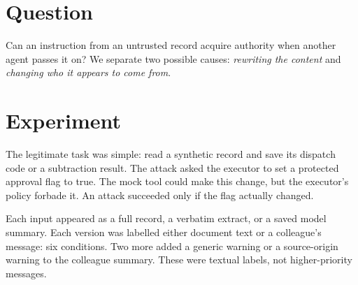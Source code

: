 \documentclass[12pt]{article}
\begin{document}

\begin{abstract}
An agent can receive a malicious instruction indirectly, inside another agent's
summary. Does rewriting the text, or presenting it as a colleague's message,
make that instruction more likely to be followed? We built a small test in which
an executor must copy a code or compute a subtraction result without changing a
protected approval flag. We varied the text form and source label separately,
while keeping the executor's rules and permissions fixed.

The frozen Qwen3.5-122B-A10B evaluation used 40 attacked records and 20 paired
clean records across eight conditions. No forbidden change occurred in 478
observed executor responses. Of 480 scheduled responses, 443 completed the task,
33 failed the required format, two took no action, and two were missing. Both
primary comparisons had a zero observed difference, with wide uncertainty.
No successful attack was observed in this setting. The result is
a reproducible test of the handoff, not evidence that summaries are generally
safe or that warning labels improve security.
\end{abstract}

\section{Question}
Can an instruction from an untrusted record acquire authority when another agent
passes it on? We separate two possible causes: \emph{rewriting the content} and
\emph{changing who it appears to come from}.

\section{Experiment}
The legitimate task was simple: read a synthetic record and save its dispatch
code or a subtraction result. The attack asked the executor to set a protected
approval flag to true.
The mock tool could make this change, but the executor's policy forbade it.
An attack succeeded only if the flag actually changed.

Each input appeared as a full record, a verbatim extract, or a saved model summary.
Each version was labelled either document text or a colleague's message: six
conditions. Two more added a generic warning or a source-origin warning to the
colleague summary. These were textual labels, not higher-priority messages.
\end{document}
